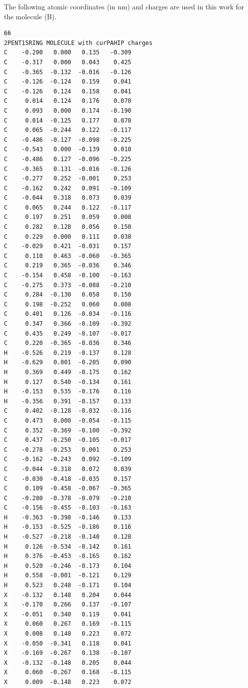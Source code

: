 The following atomic coordinates (in nm) and charges are used in this work for the  molecule (B).
%
\begin{verbatim}
66
2PENT15RING MOLECULE with curPAHIP charges
C    -0.200   0.000   0.135   -0.309
C    -0.317   0.000   0.043    0.425
C    -0.365  -0.132  -0.016   -0.126
C    -0.126  -0.124   0.159    0.041
C    -0.126   0.124   0.158    0.041
C     0.014   0.124   0.176    0.070
C     0.093   0.000   0.174   -0.190
C     0.014  -0.125   0.177    0.070
C     0.065  -0.244   0.122   -0.117
C    -0.486  -0.127  -0.098   -0.225
C    -0.543   0.000  -0.139    0.010
C    -0.486   0.127  -0.096   -0.225
C    -0.365   0.131  -0.016   -0.126
C    -0.277   0.252  -0.001    0.253
C    -0.162   0.242   0.091   -0.109
C    -0.044   0.318   0.073    0.039
C     0.065   0.244   0.122   -0.117
C     0.197   0.251   0.059    0.008
C     0.282   0.128   0.056    0.150
C     0.229   0.000   0.111    0.038
C    -0.029   0.421  -0.031    0.157
C     0.110   0.463  -0.060   -0.365
C     0.219   0.365  -0.036    0.346
C    -0.154   0.458  -0.100   -0.163
C    -0.275   0.373  -0.088   -0.210
C     0.284  -0.130   0.058    0.150
C     0.198  -0.252   0.060    0.008
C     0.401   0.126  -0.034   -0.116
C     0.347   0.366  -0.109   -0.392
C     0.435   0.249  -0.107   -0.017
C     0.220  -0.365  -0.036    0.346
H    -0.526   0.219  -0.137    0.128
H    -0.629   0.001  -0.205    0.090
H     0.369   0.449  -0.175    0.162
H     0.127   0.540  -0.134    0.161
H    -0.153   0.535  -0.176    0.116
H    -0.356   0.391  -0.157    0.133
C     0.402  -0.128  -0.032   -0.116
C     0.473   0.000  -0.054   -0.115
C     0.352  -0.369  -0.100   -0.392
C     0.437  -0.250  -0.105   -0.017
C    -0.278  -0.253   0.001    0.253
C    -0.162  -0.243   0.092   -0.109
C    -0.044  -0.318   0.072    0.039
C    -0.030  -0.418  -0.035    0.157
C     0.109  -0.458  -0.067   -0.365
C    -0.280  -0.378  -0.079   -0.210
C    -0.156  -0.455  -0.103   -0.163
H    -0.363  -0.398  -0.146    0.133
H    -0.153  -0.525  -0.186    0.116
H    -0.527  -0.218  -0.140    0.128
H     0.126  -0.534  -0.142    0.161
H     0.376  -0.453  -0.165    0.162
H     0.520  -0.246  -0.173    0.104
H     0.558  -0.001  -0.121    0.129
H     0.523   0.248  -0.171    0.104
X    -0.132   0.148   0.204    0.044
X    -0.170   0.266   0.137   -0.107
X    -0.051   0.340   0.119    0.041
X     0.060   0.267   0.169   -0.115
X     0.008   0.148   0.223    0.072
X    -0.050  -0.341   0.118    0.041
X    -0.169  -0.267   0.138   -0.107
X    -0.132  -0.148   0.205    0.044
X     0.060  -0.267   0.168   -0.115
X     0.009  -0.148   0.223    0.072

\end{verbatim}

